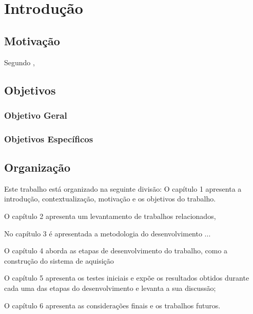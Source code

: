\chapter{Introdução}

    \section{Motivação}
        Segundo , 

    \section{Objetivos}

        \subsection{Objetivo Geral}


        \subsection{Objetivos Específicos}

    \section{Organização}

        Este trabalho está organizado na seguinte divisão: O capítulo 1 apresenta a introdução, contextualização, motivação e os objetivos do trabalho.
    
        O capítulo 2 apresenta um levantamento de trabalhos relacionados,

        No capítulo 3 é apresentada a metodologia do desenvolvimento ...
    
        O capítulo 4 aborda as etapas de desenvolvimento do trabalho, como a construção do sistema de aquisição
    
        O capítulo 5 apresenta os testes iniciais e expõe os resultados obtidos durante cada uma das etapas do desenvolvimento e levanta a sua discussão;

        O capítulo 6 apresenta as considerações finais e os trabalhos futuros.
